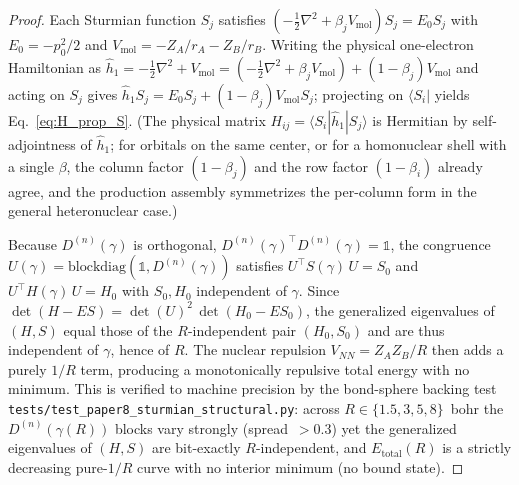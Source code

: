 \documentclass[aps,pra,twocolumn,superscriptaddress,longbibliography]{revtex4-2}
\theoremstyle{remark}
\theoremstyle{plain}
\begin{document}
\begin{proof}
Each Sturmian function $S_j$ satisfies
$(-\tfrac{1}{2}\nabla^2 + \beta_j V_{\mathrm{mol}}) S_j = E_0 S_j$
with $E_0 = -p_0^2/2$ and $V_{\mathrm{mol}} = -Z_A/r_A - Z_B/r_B$.
Writing the physical one-electron Hamiltonian as
$\hat{h}_1 = -\tfrac{1}{2}\nabla^2 + V_{\mathrm{mol}}
= (-\tfrac{1}{2}\nabla^2 + \beta_j V_{\mathrm{mol}})
+ (1-\beta_j)V_{\mathrm{mol}}$ and acting on $S_j$ gives
$\hat{h}_1 S_j = E_0 S_j + (1-\beta_j)V_{\mathrm{mol}} S_j$; projecting on
$\langle S_i|$ yields Eq.~\eqref{eq:H_prop_S}.  (The physical matrix
$H_{ij}=\langle S_i|\hat h_1|S_j\rangle$ is Hermitian by self-adjointness of
$\hat h_1$; for orbitals on the same center, or for a homonuclear shell with a
single $\beta$, the column factor $(1-\beta_j)$ and the row factor
$(1-\beta_i)$ already agree, and the production assembly symmetrizes the
per-column form in the general heteronuclear case.)

Because $D^{(n)}(\gamma)$ is orthogonal,
$D^{(n)}(\gamma)^{\!\top} D^{(n)}(\gamma)=\mathbb{1}$, the congruence
$U(\gamma)=\mathrm{blockdiag}(\mathbb{1},D^{(n)}(\gamma))$ satisfies
$U^{\!\top} S(\gamma)\,U = S_0$ and $U^{\!\top} H(\gamma)\,U = H_0$ with
$S_0,H_0$ independent of $\gamma$.  Since
$\det(H-E S) = \det(U)^2\,\det(H_0 - E S_0)$, the generalized eigenvalues
of $(H,S)$ equal those of the $R$-independent pair $(H_0,S_0)$ and are thus
independent of $\gamma$, hence of $R$.  The nuclear repulsion
$V_{NN} = Z_A Z_B / R$ then adds a purely $1/R$ term, producing a
monotonically repulsive total energy with no minimum.  This is verified to
machine precision by the bond-sphere backing test
\texttt{tests/test\_paper8\_sturmian\_structural.py}: across
$R\in\{1.5,3,5,8\}$~bohr the $D^{(n)}(\gamma(R))$ blocks vary strongly
(spread~$>0.3$) yet the generalized eigenvalues of $(H,S)$ are
bit-exactly $R$-independent, and $E_{\mathrm{total}}(R)$ is a strictly
decreasing pure-$1/R$ curve with no interior minimum (no bound state).
\end{proof}
\end{document}
